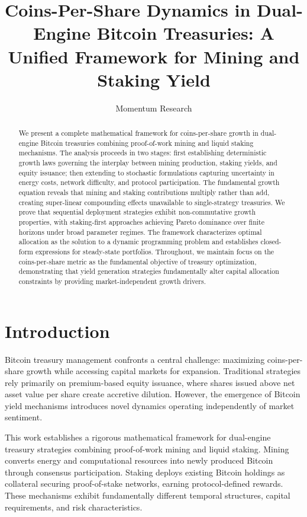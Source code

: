\documentclass[
  journal=medium,
  manuscript=article-type,
  year=2025,
  volume=1,
]{cup-journal}
\title{Coins-Per-Share Dynamics in Dual-Engine Bitcoin Treasuries: A Unified Framework for Mining and Staking Yield}
\author{Momentum Research}
\affiliation{Quantitative Finance Research Group}
\theoremstyle{definition}
\begin{document}
\begin{abstract}
We present a complete mathematical framework for coins-per-share growth in dual-engine Bitcoin treasuries combining proof-of-work mining and liquid staking mechanisms. The analysis proceeds in two stages: first establishing deterministic growth laws governing the interplay between mining production, staking yields, and equity issuance; then extending to stochastic formulations capturing uncertainty in energy costs, network difficulty, and protocol participation. The fundamental growth equation reveals that mining and staking contributions multiply rather than add, creating super-linear compounding effects unavailable to single-strategy treasuries. We prove that sequential deployment strategies exhibit non-commutative growth properties, with staking-first approaches achieving Pareto dominance over finite horizons under broad parameter regimes. The framework characterizes optimal allocation as the solution to a dynamic programming problem and establishes closed-form expressions for steady-state portfolios. Throughout, we maintain focus on the coins-per-share metric as the fundamental objective of treasury optimization, demonstrating that yield generation strategies fundamentally alter capital allocation constraints by providing market-independent growth drivers.
\end{abstract}

\section{Introduction}

Bitcoin treasury management confronts a central challenge: maximizing coins-per-share growth while accessing capital markets for expansion. Traditional strategies rely primarily on premium-based equity issuance, where shares issued above net asset value per share create accretive dilution. However, the emergence of Bitcoin yield mechanisms introduces novel dynamics operating independently of market sentiment.

This work establishes a rigorous mathematical framework for dual-engine treasury strategies combining proof-of-work mining and liquid staking. Mining converts energy and computational resources into newly produced Bitcoin through consensus participation. Staking deploys existing Bitcoin holdings as collateral securing proof-of-stake networks, earning protocol-defined rewards. These mechanisms exhibit fundamentally different temporal structures, capital requirements, and risk characteristics.
\end{document}
